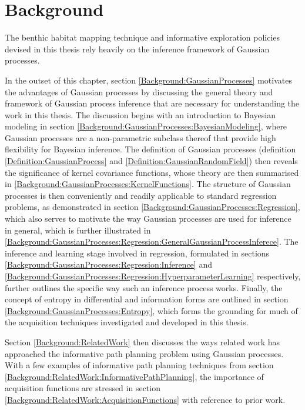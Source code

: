 \chapter{Background}
\label{Background}

	The benthic habitat mapping technique and informative exploration policies devised in this thesis rely heavily on the inference framework of Gaussian processes. 
	
	In the outset of this chapter, section \ref{Background:GaussianProcesses} motivates the advantages of Gaussian processes by discussing the general theory and framework of Gaussian process inference that are necessary for understanding the work in this thesis. The discussion begins with an introduction to Bayesian modeling in section \ref{Background:GaussianProcesses:BayesianModeling}, where Gaussian processes are a non-parametric subclass thereof that provide high flexibility for Bayesian inference. The definition of Gaussian processes (definition \ref{Definition:GaussianProcess} and \ref{Definition:GaussianRandomField}) then reveals the significance of kernel covariance functions, whose theory are then summarised in \ref{Background:GaussianProcesses:KernelFunctions}. The structure of Gaussian processes is then conveniently and readily applicable to standard regression problems, as demonstrated in section \ref{Background:GaussianProcesses:Regression}, which also serves to motivate the way Gaussian processes are used for inference in general, which is further illustrated in \ref{Background:GaussianProcesses:Regression:GeneralGaussianProcessInferece}. The inference and learning stage involved in regression, formulated in sections \ref{Background:GaussianProcesses:Regression:Inference} and \ref{Background:GaussianProcesses:Regression:HyperparameterLearning} respectively, further outlines the specific way such an inference process works. Finally, the concept of entropy in differential and information forms are outlined in section \ref{Background:GaussianProcesses:Entropy}, which forms the grounding for much of the acquisition techniques investigated and developed in this thesis.
	
	
	Section \ref{Background:RelatedWork} then discusses the ways related work has approached the informative path planning problem using Gaussian processes. With a few examples of informative path planning techniques from section \ref{Background:RelatedWork:InformativePathPlanning}, the importance of acquisition functions are stressed in section \ref{Background:RelatedWork:AcquisitionFunctions} with reference to prior work.
	
